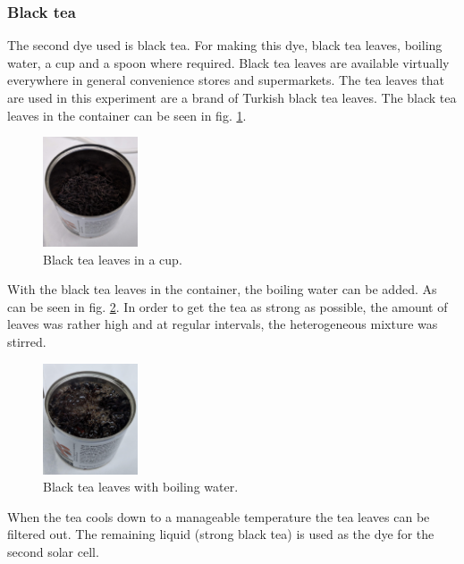 \documentclass[conference]{IEEEtran}
\begin{document}
\subsubsection{Black tea}
The second dye used is black tea. For making this dye, black tea leaves, boiling water, a cup and a spoon where required. Black tea leaves are available virtually everywhere in general convenience stores and supermarkets. The tea leaves that are used in this experiment are a brand of Turkish black tea leaves. The black tea leaves in the container can be seen in fig. \ref{fig:black tea in cup}. 

\begin{figure}[h]
\centering
\includegraphics[width=0.25\textwidth]{img/15BlackTea1.jpg}
\caption{Black tea leaves in a cup.}
\label{fig:black tea in cup} %
\end{figure}

With the black tea leaves in the container, the boiling water can be added. As can be seen in  fig. \ref{fig:add hot water}. In order to get the tea as strong as possible, the amount of leaves was rather high and at regular intervals, the heterogeneous mixture was stirred. 

\begin{figure}[H]
\centering
\includegraphics[width=0.25\textwidth]{img/16BlackTea2.jpg}
\caption{Black tea leaves with boiling water.}
\label{fig:add hot water} %
\end{figure}

When the tea cools down to a manageable temperature the tea leaves can be filtered out. The remaining liquid (strong black tea) is used as the dye for the second solar cell.
\end{document}
